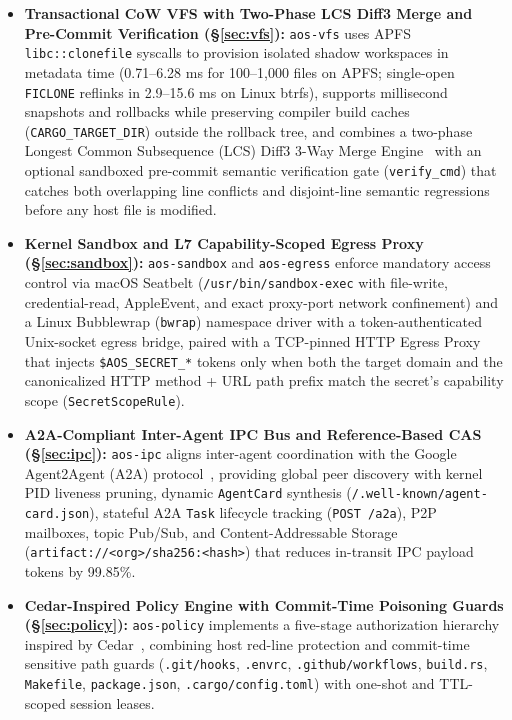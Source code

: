 \documentclass[acmsmall,screen,review]{acmart}
\begin{document}
\begin{itemize}
    \item \textbf{Transactional CoW VFS with Two-Phase LCS Diff3 Merge and Pre-Commit Verification (\S\ref{sec:vfs}):} \texttt{aos-vfs} uses APFS \texttt{libc::clonefile} syscalls to provision isolated shadow workspaces in metadata time (0.71--6.28 ms for 100--1,000 files on APFS; single-open \texttt{FICLONE} reflinks in 2.9--15.6 ms on Linux btrfs), supports millisecond snapshots and rollbacks while preserving compiler build caches (\texttt{CARGO\_TARGET\_DIR}) outside the rollback tree, and combines a two-phase Longest Common Subsequence (LCS) Diff3 3-Way Merge Engine~\cite{khanna2007formal} with an optional sandboxed pre-commit semantic verification gate (\texttt{verify\_cmd}) that catches both overlapping line conflicts and disjoint-line semantic regressions before any host file is modified.
    \item \textbf{Kernel Sandbox and L7 Capability-Scoped Egress Proxy (\S\ref{sec:sandbox}):} \texttt{aos-sandbox} and \texttt{aos-egress} enforce mandatory access control via macOS Seatbelt (\texttt{/usr/bin/sandbox-exec} with file-write, credential-read, AppleEvent, and exact proxy-port network confinement) and a Linux Bubblewrap (\texttt{bwrap}) namespace driver with a token-authenticated Unix-socket egress bridge, paired with a TCP-pinned HTTP Egress Proxy that injects \texttt{\$AOS\_SECRET\_*} tokens only when both the target domain and the canonicalized HTTP method + URL path prefix match the secret's capability scope (\texttt{SecretScopeRule}).
    \item \textbf{A2A-Compliant Inter-Agent IPC Bus and Reference-Based CAS (\S\ref{sec:ipc}):} \texttt{aos-ipc} aligns inter-agent coordination with the Google Agent2Agent (A2A) protocol~\cite{google2025a2a}, providing global peer discovery with kernel PID liveness pruning, dynamic \texttt{AgentCard} synthesis (\texttt{/.well-known/agent-card.json}), stateful A2A \texttt{Task} lifecycle tracking (\texttt{POST /a2a}), P2P mailboxes, topic Pub/Sub, and Content-Addressable Storage (\texttt{artifact://<org>/sha256:<hash>}) that reduces in-transit IPC payload tokens by 99.85\%.
    \item \textbf{Cedar-Inspired Policy Engine with Commit-Time Poisoning Guards (\S\ref{sec:policy}):} \texttt{aos-policy} implements a five-stage authorization hierarchy inspired by Cedar~\cite{cutler2024cedar}, combining host red-line protection and commit-time sensitive path guards (\texttt{.git/hooks}, \texttt{.envrc}, \texttt{.github/workflows}, \texttt{build.rs}, \texttt{Makefile}, \texttt{package.json}, \texttt{.cargo/config.toml}) with one-shot and TTL-scoped session leases.

\end{itemize}
\end{document}
